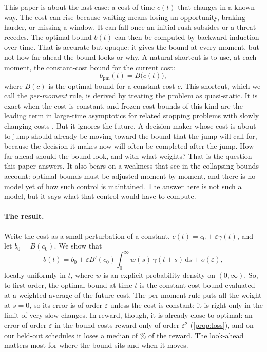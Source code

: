 \documentclass[11pt]{article}
\theoremstyle{definition}
\theoremstyle{remark}
\newcommand{\dd}{\,\mathrm{d}}
\begin{document}
This paper is about the last case: a cost of time $c(t)$ that changes in a known way. The cost can
rise because waiting means losing an opportunity, braking harder, or missing a window. It can fall
once an initial rush subsides or a threat recedes. The optimal bound $b(t)$ can then be computed by
backward induction over time. That is accurate but opaque: it gives the bound at every moment, but
not how far ahead the bound looks or why. A natural shortcut is to use, at each moment, the
constant-cost bound for the current cost:
\begin{equation}
  b_{\mathrm{pm}}(t) = B\bigl(c(t)\bigr),
  \label{eq:per-moment}
\end{equation}
where $B(c)$ is the optimal bound for a constant cost $c$. This shortcut, which we call the
\emph{per-moment} rule, is derived by treating the problem as quasi-static. It is exact when the
cost is constant, and frozen-cost bounds of this kind are the leading term in large-time
asymptotics for related stopping problems with slowly changing costs \citep{irle2001,muravlev2020}.
But it ignores the future. A decision maker whose cost is about to jump should already be moving
toward the bound that the jump will call for, because the decision it makes now will often be
completed after the jump. How far ahead should the bound look, and with what weights? That is the
question this paper answers. It also bears on a weakness that \citet[p.~163]{smith2025} see in the
collapsing-bounds account: optimal bounds must be adjusted moment by moment, and there is no model
yet of how such control is maintained. The answer here is not such a model, but it says what that
control would have to compute.

\paragraph{The result.}
Write the cost as a small perturbation of a constant, $c(t) = c_0 + \varepsilon\gamma(t)$, and let
$b_0 = B(c_0)$. We show that
\begin{equation}
  b(t) = b_0 + \varepsilon B'(c_0) \int_0^\infty w(s)\,\gamma(t+s)\dd s + o(\varepsilon),
  \label{eq:main}
\end{equation}
locally uniformly in $t$, where $w$ is an explicit probability density on $(0,\infty)$. So, to
first order, the optimal bound at time $t$ is the constant-cost bound evaluated at a weighted
average of the future cost. The per-moment rule puts all the weight at $s = 0$, so its error is of
order $\varepsilon$ unless the cost is constant; it is right only in the limit of very slow
changes. In reward, though, it is already close to optimal: an error of order $\varepsilon$ in the
bound costs reward only of order $\varepsilon^2$ (\cref{prop:loss}), and on our held-out schedules
it loses a median of \HeldShareMedian\% of the reward. The look-ahead matters most for where the
bound sits and when it moves.
\end{document}
